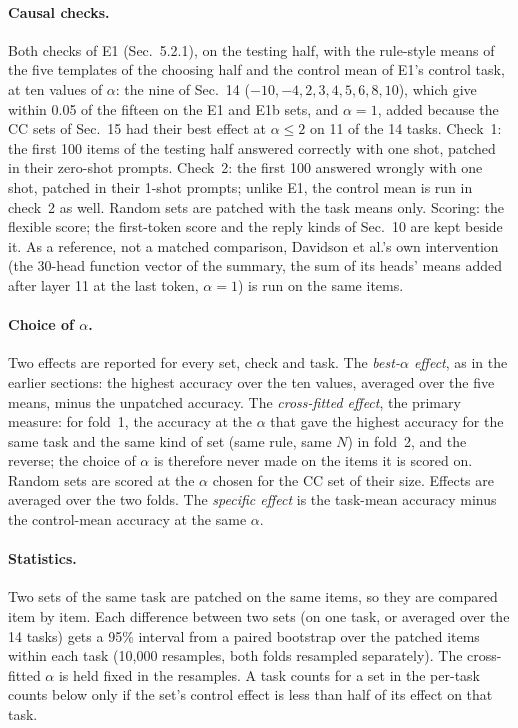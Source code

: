 \paragraph{Causal checks.} Both checks of E1 (Sec.~5.2.1), on the testing half, with the
rule-style means of the five templates of the choosing half and the control mean of E1's
control task, at ten values of $\alpha$: the nine of Sec.~14 ($-10, -4, 2, 3, 4, 5, 6, 8, 10$),
which give within 0.05 of the fifteen on the E1 and E1b sets, and $\alpha = 1$, added because
the CC sets of Sec.~15 had their best effect at $\alpha \le 2$ on 11 of the 14 tasks. Check~1: the first 100 items of
the testing half answered correctly with one shot, patched in their zero-shot prompts. Check~2:
the first 100 answered wrongly with one shot, patched in their 1-shot prompts; unlike E1, the
control mean is run in check~2 as well. Random sets are patched with the task means only.
Scoring: the flexible score; the first-token score and the reply kinds of Sec.~10 are kept beside
it. As a reference, not a matched comparison, Davidson et al.'s own intervention (the 30-head
function vector of the summary, the sum of its heads' means added after layer 11 at the last
token, $\alpha = 1$) is run on the
same items.

\paragraph{Choice of $\alpha$.} Two effects are reported for every set, check and task. The
\emph{best-$\alpha$ effect}, as in the earlier sections: the highest accuracy over the ten
values, averaged over the five means, minus the unpatched accuracy. The \emph{cross-fitted
effect}, the primary measure: for fold~1, the accuracy at the $\alpha$ that gave the highest
accuracy for the same task and the same kind of set (same rule, same $N$) in fold~2, and the
reverse; the
choice of $\alpha$ is therefore never made on the items it is scored on. Random sets are scored
at the $\alpha$ chosen for the CC set of their size. Effects are averaged over the two folds.
The \emph{specific effect} is the task-mean accuracy minus the control-mean accuracy at the
same $\alpha$.

\paragraph{Statistics.} Two sets of the same task are patched on the same items, so they are
compared item by item. Each difference between two sets (on one task, or averaged over the 14
tasks) gets a 95\% interval from a paired bootstrap over the patched items within each task
(10{,}000 resamples, both folds resampled separately). The cross-fitted $\alpha$ is held fixed
in the resamples. A task counts for a set in the
per-task counts below only if the set's control effect is less than half of its effect on that
task.

